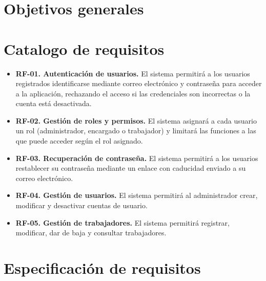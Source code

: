 \section{Objetivos generales}

\section{Catalogo de requisitos}

	\begin{itemize}
		\item \textbf{RF-01. Autenticación de usuarios.} El sistema permitirá a los usuarios registrados identificarse mediante correo electrónico y contraseña para acceder a la aplicación, rechazando el acceso si las credenciales son incorrectas o la cuenta está desactivada.
		\item \textbf{RF-02. Gestión de roles y permisos.} El sistema asignará a cada usuario un rol (administrador, encargado o trabajador) y limitará las funciones a las que puede acceder según el rol asignado.
		\item \textbf{RF-03. Recuperación de contraseña.} El sistema permitirá a los usuarios restablecer su contraseña mediante un enlace con caducidad enviado a su correo electrónico.
		\item \textbf{RF-04. Gestión de usuarios.} El sistema permitirá al administrador crear, modificar y desactivar cuentas de usuario.
		\item \textbf{RF-05. Gestión de trabajadores.} El sistema permitirá registrar, modificar, dar de baja y consultar trabajadores.
	\end{itemize}

\section{Especificación de requisitos}


